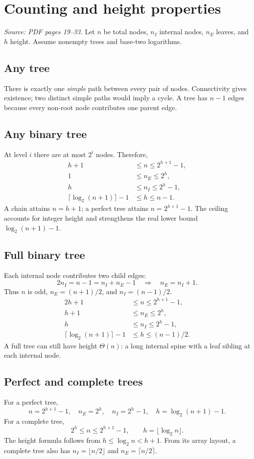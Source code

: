 \documentclass[11pt,letterpaper]{article}
\newcommand{\sourcepages}[1]{\textit{Source: PDF pages #1.}}
\begin{document}
\section{Counting and height properties}
\sourcepages{19--33}
Let $n$ be total nodes, $n_I$ internal nodes, $n_E$ leaves, and $h$ height. Assume nonempty trees and base-two logarithms.

\subsection{Any tree}
There is exactly one \emph{simple} path between every pair of nodes. Connectivity gives existence; two distinct simple paths would imply a cycle. A tree has $n-1$ edges because every non-root node contributes one parent edge.

\subsection{Any binary tree}
At level $i$ there are at most $2^i$ nodes. Therefore,
\begin{align*}
h+1&\leq n\leq2^{h+1}-1,\\
1&\leq n_E\leq2^h,\\
h&\leq n_I\leq2^h-1,\\
\lceil\log_2(n+1)\rceil-1&\leq h\leq n-1.
\end{align*}
A chain attains $n=h+1$; a perfect tree attains $n=2^{h+1}-1$. The ceiling accounts for integer height and strengthens the real lower bound $\log_2(n+1)-1$.

\subsection{Full binary tree}
Each internal node contributes two child edges:
\[
2n_I=n-1=n_I+n_E-1\quad\Longrightarrow\quad n_E=n_I+1.
\]
Thus $n$ is odd, $n_E=(n+1)/2$, and $n_I=(n-1)/2$.
\begin{align*}
2h+1&\leq n\leq2^{h+1}-1,\\
h+1&\leq n_E\leq2^h,\\
h&\leq n_I\leq2^h-1,\\
\lceil\log_2(n+1)\rceil-1&\leq h\leq(n-1)/2.
\end{align*}
A full tree can still have height $\Theta(n)$: a long internal spine with a leaf sibling at each internal node.

\subsection{Perfect and complete trees}
For a perfect tree,
\[
n=2^{h+1}-1,\quad n_E=2^h,\quad n_I=2^h-1,\quad
h=\log_2(n+1)-1.
\]
For a complete tree,
\[
2^h\leq n\leq2^{h+1}-1,\qquad h=\lfloor\log_2n\rfloor.
\]
The height formula follows from $h\leq\log_2n<h+1$. From its array layout, a complete tree also has $n_I=\lfloor n/2\rfloor$ and $n_E=\lceil n/2\rceil$.
\end{document}
